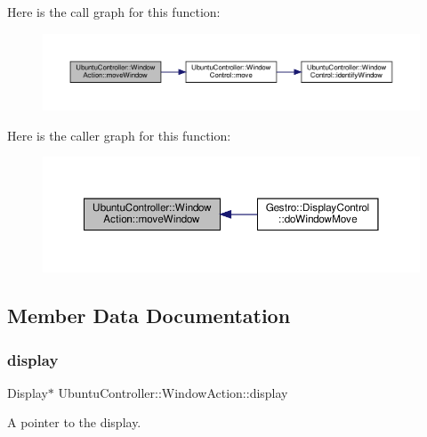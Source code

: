 Here is the call graph for this function\+:
\nopagebreak
\begin{figure}[H]
\begin{center}
\leavevmode
\includegraphics[width=350pt]{class_ubuntu_controller_1_1_window_action_ae79c374bbbc84ff3dfb8565ede5f4220_cgraph}
\end{center}
\end{figure}
Here is the caller graph for this function\+:
\nopagebreak
\begin{figure}[H]
\begin{center}
\leavevmode
\includegraphics[width=350pt]{class_ubuntu_controller_1_1_window_action_ae79c374bbbc84ff3dfb8565ede5f4220_icgraph}
\end{center}
\end{figure}


\subsection{Member Data Documentation}
\mbox{\label{class_ubuntu_controller_1_1_window_action_a48d88d865a625a45df6f48d20ab62066}} 
\subsubsection{\texorpdfstring{display}{display}}
{\footnotesize\ttfamily Display$\ast$ Ubuntu\+Controller\+::\+Window\+Action\+::display\hspace{0.3cm}{\ttfamily [private]}}



A pointer to the display. 



